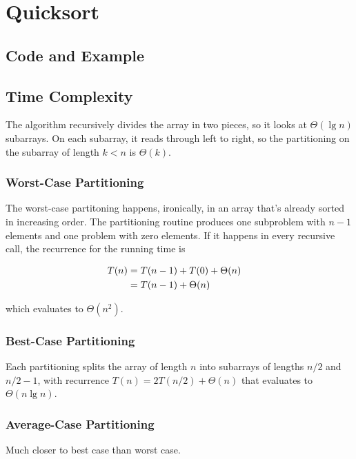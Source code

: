 \section{Quicksort}

\subsection{Code and Example}





\subsection{Time Complexity}

The algorithm recursively divides the array in two pieces, so it looks at $\Theta(\lg n)$ subarrays.  On each subarray, it reads through left to right, so the partitioning on the subarray of length $k<n$ is $\Theta(k)$.  

\subsubsection{Worst-Case Partitioning}

The worst-case partitoning happens, ironically, in an array that's already sorted in increasing order.  The partitioning routine produces one subproblem with $n-1$ elements and one problem with zero elements.  If it happens in every recursive call, the recurrence for the running time is 

\begin{align*}
	T(n) &= T(n-1) + T(0) + \Theta(n) \cr
		&= T(n-1) + \Theta(n) \cr
\end{align*}

which evaluates to $\Theta(n^2)$.  

\subsubsection{Best-Case Partitioning}

Each partitioning splits the array of length $n$ into subarrays of lengths $n/2$ and $n/2 - 1$, with recurrence $T(n) = 2T(n/2) + \Theta(n)$ that evaluates to $\Theta(n \lg n)$.  

\subsubsection{Average-Case Partitioning}

Much closer to best case than worst case.  


